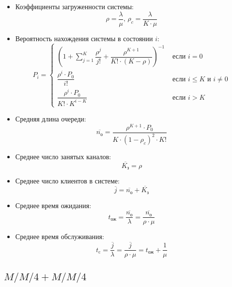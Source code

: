 \begin{itemize}
	\item Коэффициенты загруженности системы:
		\begin{displaymath}
			\rho = \dfrac{\lambda}{\mu}\text{,  } \rho_c = \dfrac{\lambda}{K \cdot \mu}
		\end{displaymath}
	\item Вероятность нахождения системы в состоянии $i$:
		\begin{displaymath}
			P_i = 
			\begin{cases}
				\left( 1 + \sum \limits_{j=1}^{K} \dfrac{\rho^j}{j!} + \dfrac{\rho^{K+1}}{K! \cdot (K - \rho)} \right)^{-1} &\text{ если } i = 0 \\[15pt]
				\dfrac{\rho^i \cdot P_0}{i!} &\text{ если } i \leq K \text{ и } i \neq 0 \\[15pt]
				\dfrac{\rho^i \cdot P_0}{K! \cdot K^{i-K}} &\text{ если } i > K
			\end{cases}
		\end{displaymath}
		
	\item Средняя длина очереди:
		\begin{displaymath}
			\overline{n_\text{о}} = \dfrac{\rho^{K+1} \cdot P_0}{K \cdot (1 - \rho_c)^2 \cdot K!}
		\end{displaymath}
		
	\item Среднее число занятых каналов:
		\begin{displaymath}
			\overline{K_\text{з}} = \rho
		\end{displaymath}
		
	\item Среднее число клиентов в системе:
		\begin{displaymath}
			\overline{j} = \overline{n_\text{о}} + \overline{K_\text{з}}
		\end{displaymath}
		
	\item Среднее время ожидания:
		\begin{displaymath}
			t_\text{ож} = \dfrac{\overline{n_\text{о}}}{\lambda} = \dfrac{\overline{n_\text{о}}}{\rho \cdot \mu}
		\end{displaymath}
		
	\item Среднее время обслуживания:
		\begin{displaymath}
			t_\text{c} = \dfrac{\overline{j}}{\lambda} = \dfrac{\overline{j}}{\rho \cdot \mu} = t_\text{ож} + \dfrac{1}{\mu}
		\end{displaymath}
\end{itemize}

\subsection{$M/M/4 + M/M/4$}

